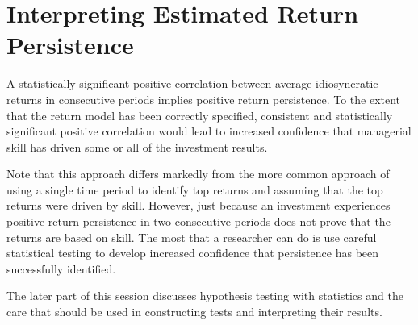 \documentclass[11pt]{article}
\begin{document}
\section*{Interpreting Estimated Return Persistence}
A statistically significant positive correlation between average idiosyncratic returns in consecutive periods implies positive return persistence. To the extent that the return model has been correctly specified, consistent and statistically significant positive correlation would lead to increased confidence that managerial skill has driven some or all of the investment results.

Note that this approach differs markedly from the more common approach of using a single time period to identify top returns and assuming that the top returns were driven by skill. However, just because an investment experiences positive return persistence in two consecutive periods does not prove that the returns are based on skill. The most that a researcher can do is use careful statistical testing to develop increased confidence that persistence has been successfully identified.

The later part of this session discusses hypothesis testing with statistics and the care that should be used in constructing tests and interpreting their results.
\end{document}
